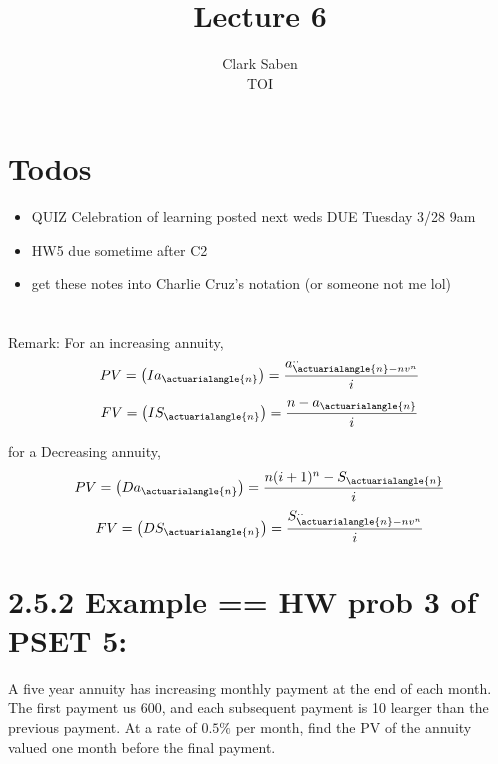 \documentclass[12pt]{article}
\begin{document}
 
 
\title{Lecture 6}%
\author{Clark Saben\\ %
TOI} %
 
\maketitle

\section{Todos}

\begin{itemize}
	\item QUIZ Celebration of learning posted next weds DUE Tuesday 3/28 9am
	\item HW5 due sometime after C2
	\item get these notes into Charlie Cruz's notation (or someone not me lol)
\end{itemize}

\section{}
Remark: For an increasing annuity,\\
$$
PV = \left(Ia_{\actuarialangle{n}}\right) = \frac{a^{..}_{\actuarialangle{n} -nv^n}}{i}
$$
$$
FV = \left(IS_{\actuarialangle{n}}\right) = \frac{n - a_{\actuarialangle{n}}}{i}
$$

for a Decreasing  annuity,\\
$$
PV = \left(Da_{\actuarialangle{n}}\right) = \frac{n(i+1)^n - S_{\actuarialangle{n}}}{i}
$$
$$
FV = \left(DS_{\actuarialangle{n}}\right) = \frac{S^{..}_{\actuarialangle{n} -nv^n}}{i}
$$

\section{2.5.2 Example == HW prob 3 of PSET 5:}
A five year annuity has increasing monthly payment at the end of each month. The first payment
us 600, and each subsequent payment is 10 learger than the previous payment. At a rate of
$0.5\%$ per month, find the PV of the annuity valued one month before the final payment.
\end{document}
